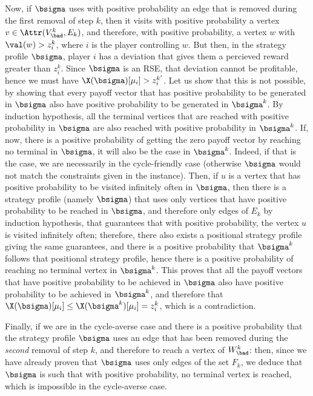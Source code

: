 \begin{itemize}
        Now, if $\bsigma$ uses with positive probability an edge that is removed during the first removal of step $k$, then it visits with positive probability a vertex $v \in \Attr(V^k_\bad, E_k)$, and therefore, with positive probability, a vertex $w$ with $\val(w) > z^k_i$, where $i$ is the player controlling $w$.
        But then, in the strategy profile $\bsigma$, player $i$ has a deviation that gives them a percieved reward greater than $z^k_i$.
        Since $\bsigma$ is an RSE, that deviation cannot be profitable, hence we must have $\X(\bsigma)[\mu_i] > z^{k'}_i$.
        Let us show that this is not possible, by showing that every payoff vector that has positive probability to be generated in $\bsigma$ also have positive probability to be generated in $\bsigma^k$.
        By induction hypothesis, all the terminal vertices that are reached with positive probability in $\bsigma$ are also reached with positive probability in $\bsigma^k$.
        If, now, there is a positive probability of getting the zero payoff vector by reaching no terminal in $\bsigma$, it will also be the case in $\bsigma^k$.
        Indeed, if that is the case, we are necessarily in the cycle-friendly case (otherwise $\bsigma$ would not match the constraints given in the instance).
        Then, if $u$ is a vertex that has positive probability to be visited infinitely often in $\bsigma$, then there is a strategy profile (namely $\bsigma$) that uses only vertices that have positive probability to be reached in $\bsigma$, and therefore only edges of $E_k$ by induction hypothesis, that guarantees that with positive probability, the vertex $u$ is visited infinitely often; therefore, there also exists a positional strategy profile giving the same guarantees, and there is a positive probability that $\bsigma^k$ follows that positional strategy profile, hence there is a positive probability of reaching no terminal vertex in $\bsigma^k$.
        This proves that all the payoff vectors that have positive probability to be achieved in $\bsigma$ also have positive probability to be achieved in $\bsigma^k$, and therefore that $\X(\bsigma)[\mu_i] \leq \X({\bsigma^k})[\mu_i] = z^k_i$, which is a contradiction.

        Finally, if we are in the cycle-averse case and there is a positive probability that the strategy profile $\bsigma$ uses an edge that has been removed during the \emph{second} removal of step $k$, and therefore to reach a vertex of $W^k_\bad$: then, since we have already proven that $\bsigma$ uses only edges of the set $F_k$, we deduce that $\bsigma$ is such that with positive probability, no terminal vertex is reached, which is impossible in the cycle-averse case.



\end{itemize}
